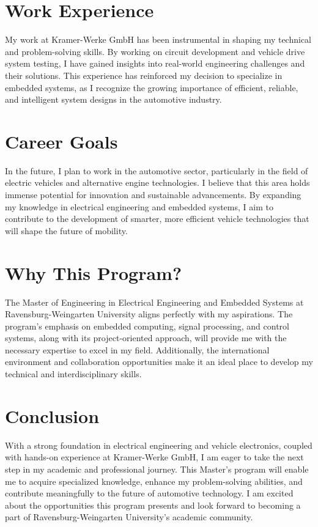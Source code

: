 \documentclass[11pt,a4paper]{article}
\begin{document}
\section*{Work Experience}
My work at Kramer-Werke GmbH has been instrumental in shaping my technical and problem-solving skills. By working on circuit development and vehicle drive system testing, I have gained insights into real-world engineering challenges and their solutions. This experience has reinforced my decision to specialize in embedded systems, as I recognize the growing importance of efficient, reliable, and intelligent system designs in the automotive industry.

\section*{Career Goals}
In the future, I plan to work in the automotive sector, particularly in the field of electric vehicles and alternative engine technologies. I believe that this area holds immense potential for innovation and sustainable advancements. By expanding my knowledge in electrical engineering and embedded systems, I aim to contribute to the development of smarter, more efficient vehicle technologies that will shape the future of mobility.

\section*{Why This Program?}
The Master of Engineering in Electrical Engineering and Embedded Systems at Ravensburg-Weingarten University aligns perfectly with my aspirations. The program's emphasis on embedded computing, signal processing, and control systems, along with its project-oriented approach, will provide me with the necessary expertise to excel in my field. Additionally, the international environment and collaboration opportunities make it an ideal place to develop my technical and interdisciplinary skills.

\section*{Conclusion}
With a strong foundation in electrical engineering and vehicle electronics, coupled with hands-on experience at Kramer-Werke GmbH, I am eager to take the next step in my academic and professional journey. This Master's program will enable me to acquire specialized knowledge, enhance my problem-solving abilities, and contribute meaningfully to the future of automotive technology. I am excited about the opportunities this program presents and look forward to becoming a part of Ravensburg-Weingarten University's academic community.
\end{document}
